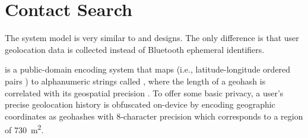 \section{Contact Search}\label{sec:contact-search}

\newcommand{\histories}{\vSet{H}}
\newcommand{\locations}{\mathbb{L}}
\newcommand{\locset}{\vSet{L}}
\newcommand{\latitude}{\phi}
\newcommand{\longitude}{\lambda}
\newcommand{\users}{\vSet{U}}
\newcommand{\sindex}{\vSet{I}}
\newcommand{\query}{\vSet{N}}
\newcommand{\qelement}{q}
\newcommand{\hone}{G}
\newcommand{\htwo}{H}
\newcommand{\neighbors}{\vSet{N}}


The system model is very similar to \citet{Ayday2020, Ayday2021} and designs. The only difference is that user geolocation data is collected instead of Bluetooth ephemeral identifiers.

 is a public-domain encoding system that maps  (i.e., latitude-longitude ordered pairs \cite[p. 5]{Sickle2004}) to alphanumeric strings called , where the length of a geohash is correlated with its geospatial precision \citep{Morton1966}. To offer some basic privacy, a user's precise geolocation history is obfuscated on-device by encoding geographic coordinates as geohashes with 8-character precision which corresponds to a region of \qty{730}{\meter^2}.

